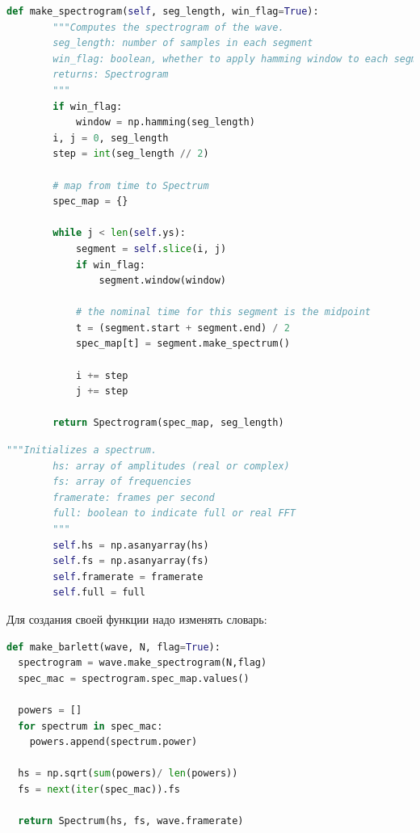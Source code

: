 \begin{lstlisting}[language=Python]
    def make_spectrogram(self, seg_length, win_flag=True):
        """Computes the spectrogram of the wave.
        seg_length: number of samples in each segment
        win_flag: boolean, whether to apply hamming window to each segment
        returns: Spectrogram
        """
        if win_flag:
            window = np.hamming(seg_length)
        i, j = 0, seg_length
        step = int(seg_length // 2)

        # map from time to Spectrum
        spec_map = {}

        while j < len(self.ys):
            segment = self.slice(i, j)
            if win_flag:
                segment.window(window)

            # the nominal time for this segment is the midpoint
            t = (segment.start + segment.end) / 2
            spec_map[t] = segment.make_spectrum()

            i += step
            j += step

        return Spectrogram(spec_map, seg_length)
\end{lstlisting}
\begin{lstlisting}[language=Python]
        """Initializes a spectrum.
        hs: array of amplitudes (real or complex)
        fs: array of frequencies
        framerate: frames per second
        full: boolean to indicate full or real FFT
        """
        self.hs = np.asanyarray(hs)
        self.fs = np.asanyarray(fs)
        self.framerate = framerate
        self.full = full
\end{lstlisting}

Для создания своей функции надо изменять словарь:
\begin{lstlisting}[language=Python]
def make_barlett(wave, N, flag=True):
  spectrogram = wave.make_spectrogram(N,flag)
  spec_mac = spectrogram.spec_map.values()

  powers = []
  for spectrum in spec_mac:
    powers.append(spectrum.power)
  
  hs = np.sqrt(sum(powers)/ len(powers))
  fs = next(iter(spec_mac)).fs

  return Spectrum(hs, fs, wave.framerate)
\end{lstlisting}


